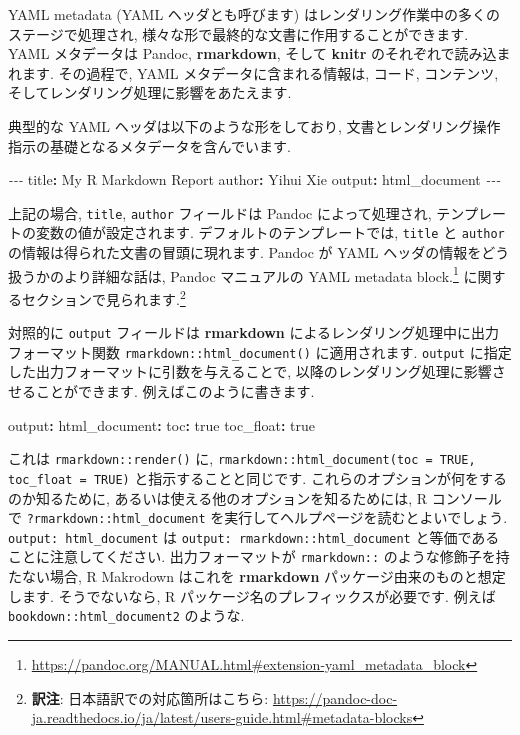 \documentclass[
  11pt,
  lualatex,ja=standard,jafont=noto]{bxjsreport}
\newenvironment{Shaded}{\begin{snugshade}}{\end{snugshade}}
\newcommand{\AttributeTok}[1]{\textcolor[rgb]{0.77,0.63,0.00}{#1}}
\newcommand{\CharTok}[1]{\textcolor[rgb]{0.31,0.60,0.02}{#1}}
\newcommand{\FunctionTok}[1]{\textcolor[rgb]{0.00,0.00,0.00}{#1}}
\newcommand{\KeywordTok}[1]{\textcolor[rgb]{0.13,0.29,0.53}{\textbf{#1}}}
\newcommand{\PreprocessorTok}[1]{\textcolor[rgb]{0.56,0.35,0.01}{\textit{#1}}}
\renewcommand{\href}[2]{#2\footnote{\url{#1}}}
\begin{document}
YAML metadata (YAML ヘッダとも呼びます) はレンダリング作業中の多くのステージで処理され, 様々な形で最終的な文書に作用することができます. YAML メタデータは Pandoc, \textbf{rmarkdown}, そして \textbf{knitr} のそれぞれで読み込まれます. その過程で, YAML メタデータに含まれる情報は, コード, コンテンツ, そしてレンダリング処理に影響をあたえます.

典型的な YAML ヘッダは以下のような形をしており, 文書とレンダリング操作指示の基礎となるメタデータを含んでいます.

\begin{Shaded}
\begin{Highlighting}[]
\PreprocessorTok{{-}{-}{-}}
\FunctionTok{title}\KeywordTok{:}\AttributeTok{ My R Markdown Report}
\FunctionTok{author}\KeywordTok{:}\AttributeTok{ Yihui Xie}
\FunctionTok{output}\KeywordTok{:}\AttributeTok{ html\_document}
\PreprocessorTok{{-}{-}{-}}
\end{Highlighting}
\end{Shaded}

上記の場合, \texttt{title}, \texttt{author} フィールドは Pandoc によって処理され, テンプレートの変数の値が設定されます. デフォルトのテンプレートでは, \texttt{title} と \texttt{author} の情報は得られた文書の冒頭に現れます. Pandoc が YAML ヘッダの情報をどう扱うかのより詳細な話は, Pandoc マニュアルの \href{https://pandoc.org/MANUAL.html\#extension-yaml_metadata_block}{YAML metadata block.} に関するセクションで見られます.\footnote{\textbf{訳注}: 日本語訳での対応箇所はこちら: \url{https://pandoc-doc-ja.readthedocs.io/ja/latest/users-guide.html\#metadata-blocks}}

対照的に \texttt{output} フィールドは \textbf{rmarkdown} によるレンダリング処理中に出力フォーマット関数 \texttt{rmarkdown::html\_document()} に適用されます. \texttt{output} に指定した出力フォーマットに引数を与えることで, 以降のレンダリング処理に影響させることができます. 例えばこのように書きます.

\begin{Shaded}
\begin{Highlighting}[]
\FunctionTok{output}\KeywordTok{:}
\AttributeTok{  }\FunctionTok{html\_document}\KeywordTok{:}
\AttributeTok{    }\FunctionTok{toc}\KeywordTok{:}\AttributeTok{ }\CharTok{true}
\AttributeTok{    }\FunctionTok{toc\_float}\KeywordTok{:}\AttributeTok{ }\CharTok{true}
\end{Highlighting}
\end{Shaded}

これは \texttt{rmarkdown::render()} に, \texttt{rmarkdown::html\_document(toc = TRUE, toc\_float = TRUE)} と指示することと同じです. これらのオプションが何をするのか知るために, あるいは使える他のオプションを知るためには, R コンソールで \texttt{?rmarkdown::html\_document} を実行してヘルプページを読むとよいでしょう. \texttt{output: html\_document} は \texttt{output: rmarkdown::html\_document} と等価であることに注意してください. 出力フォーマットが \texttt{rmarkdown::} のような修飾子を持たない場合, R Makrodown はこれを \textbf{rmarkdown} パッケージ由来のものと想定します. そうでないなら, R パッケージ名のプレフィックスが必要です. 例えば \texttt{bookdown::html\_document2} のような.
\end{document}
